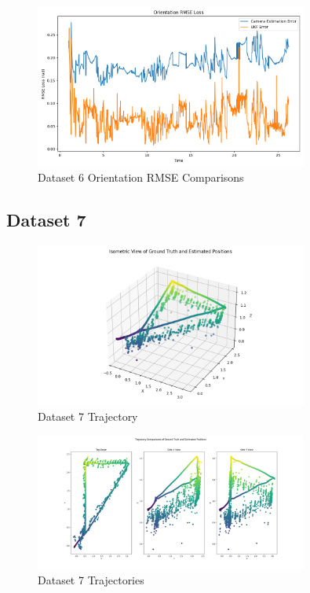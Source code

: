 \documentclass{article}
\begin{document}
\begin{figure}[H]
    \centering
    \includegraphics[width=0.8\textwidth]{./imgs/task4/studentdata6_ukf_orientation_rmse.png}
    \caption{Dataset 6 Orientation RMSE Comparisons}
\end{figure}

\subsection*{Dataset 7}

\begin{figure}[H]
    \centering
    \includegraphics[width=0.8\textwidth]{./imgs/task4/studentdata7_ukf_isometric.png}
    \caption{Dataset 7 Trajectory}
\end{figure}

\begin{figure}[H]
    \centering
    \includegraphics[width=0.8\textwidth]{./imgs/task4/studentdata7_ukf_positions.png}
    \caption{Dataset 7 Trajectories}
\end{figure}
\end{document}

